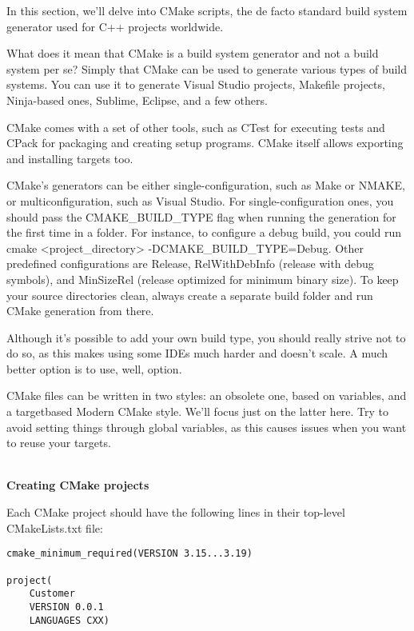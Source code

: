 
In this section, we'll delve into CMake scripts, the de facto standard build system generator used for C++ projects worldwide.


What does it mean that CMake is a build system generator and not a build system per se? Simply that CMake can be used to generate various types of build systems. You can use it to generate Visual Studio projects, Makefile projects, Ninja-based ones, Sublime, Eclipse, and a few others.

CMake comes with a set of other tools, such as CTest for executing tests and CPack for packaging and creating setup programs. CMake itself allows exporting and installing targets too.

CMake's generators can be either single-configuration, such as Make or NMAKE, or multiconfiguration, such as Visual Studio. For single-configuration ones, you should pass the CMAKE\_BUILD\_TYPE flag when running the generation for the first time in a folder. For instance, to configure a debug build, you could run cmake <project\_directory> -DCMAKE\_BUILD\_TYPE=Debug. Other predefined configurations are Release, RelWithDebInfo (release with debug symbols), and MinSizeRel (release optimized for minimum binary size). To keep your source directories clean, always create a separate build folder and run CMake generation from there.

Although it's possible to add your own build type, you should really strive not to do so, as this makes using some IDEs much harder and doesn't scale. A much better option is to use, well, option.

CMake files can be written in two styles: an obsolete one, based on variables, and a targetbased Modern CMake style. We'll focus just on the latter here. Try to avoid setting things through global variables, as this causes issues when you want to reuse your targets.

\hspace*{\fill} \\ %
\noindent
\textbf{Creating CMake projects}

Each CMake project should have the following lines in their top-level CMakeLists.txt file:

\begin{lstlisting}[style=styleCMake]
cmake_minimum_required(VERSION 3.15...3.19)

project(
	Customer
	VERSION 0.0.1
	LANGUAGES CXX)
\end{lstlisting}

